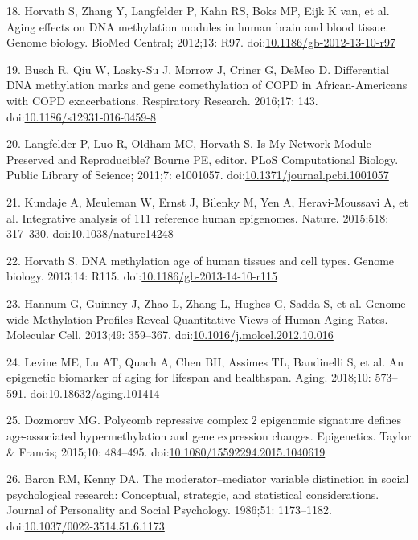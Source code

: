 \documentclass[]{article}
\theoremstyle{definition}
\theoremstyle{definition}
\theoremstyle{definition}
\theoremstyle{remark}
\begin{document}
18. Horvath S, Zhang Y, Langfelder P, Kahn RS, Boks MP, Eijk K van, et
al. Aging effects on DNA methylation modules in human brain and blood
tissue. Genome biology. BioMed Central; 2012;13: R97.
doi:\href{http://dx.doi.org/10.1186/gb-2012-13-10-r97}{10.1186/gb-2012-13-10-r97}

19. Busch R, Qiu W, Lasky-Su J, Morrow J, Criner G, DeMeo D.
Differential DNA methylation marks and gene comethylation of COPD in
African-Americans with COPD exacerbations. Respiratory Research.
2016;17: 143.
doi:\href{http://dx.doi.org/10.1186/s12931-016-0459-8}{10.1186/s12931-016-0459-8}

20. Langfelder P, Luo R, Oldham MC, Horvath S. Is My Network Module
Preserved and Reproducible? Bourne PE, editor. PLoS Computational
Biology. Public Library of Science; 2011;7: e1001057.
doi:\href{http://dx.doi.org/10.1371/journal.pcbi.1001057}{10.1371/journal.pcbi.1001057}

21. Kundaje A, Meuleman W, Ernst J, Bilenky M, Yen A, Heravi-Moussavi A,
et al. Integrative analysis of 111 reference human epigenomes. Nature.
2015;518: 317--330.
doi:\href{http://dx.doi.org/10.1038/nature14248}{10.1038/nature14248}

22. Horvath S. DNA methylation age of human tissues and cell types.
Genome biology. 2013;14: R115.
doi:\href{http://dx.doi.org/10.1186/gb-2013-14-10-r115}{10.1186/gb-2013-14-10-r115}

23. Hannum G, Guinney J, Zhao L, Zhang L, Hughes G, Sadda S, et al.
Genome-wide Methylation Profiles Reveal Quantitative Views of Human
Aging Rates. Molecular Cell. 2013;49: 359--367.
doi:\href{http://dx.doi.org/10.1016/j.molcel.2012.10.016}{10.1016/j.molcel.2012.10.016}

24. Levine ME, Lu AT, Quach A, Chen BH, Assimes TL, Bandinelli S, et al.
An epigenetic biomarker of aging for lifespan and healthspan. Aging.
2018;10: 573--591.
doi:\href{http://dx.doi.org/10.18632/aging.101414}{10.18632/aging.101414}

25. Dozmorov MG. Polycomb repressive complex 2 epigenomic signature
defines age-associated hypermethylation and gene expression changes.
Epigenetics. Taylor \& Francis; 2015;10: 484--495.
doi:\href{http://dx.doi.org/10.1080/15592294.2015.1040619}{10.1080/15592294.2015.1040619}

26. Baron RM, Kenny DA. The moderator--mediator variable distinction in
social psychological research: Conceptual, strategic, and statistical
considerations. Journal of Personality and Social Psychology. 1986;51:
1173--1182.
doi:\href{http://dx.doi.org/10.1037/0022-3514.51.6.1173}{10.1037/0022-3514.51.6.1173}
\end{document}
